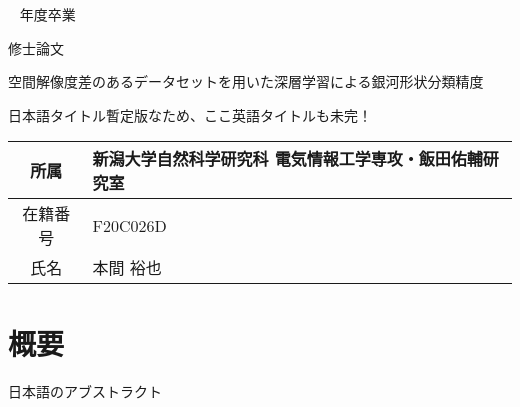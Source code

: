 \documentclass[a4j, 11pt]{jarticle}
\newcounter{fiscal_year}         %
\begin{document}
\begin{titlepage}\Large ~
{\normalsize \the\value{fiscal_year} 年度卒業}
\vfill
\begin{center}

{\Huge 修士論文}
\end{center}
\begin{center}

空間解像度差のあるデータセットを用いた深層学習による銀河形状分類精度
\end{center}
\begin{center}

日本語タイトル暫定版なため、ここ英語タイトルも未完！
\end{center}
\vfill
\begin{center}
\begin{tabular}{|c|l|}
\hline

所属 & 新潟大学自然科学研究科 電気情報工学専攻・飯田佑輔研究室 \\
\hline

在籍番号 & F20C026D \\
\hline

氏名 & 本間 裕也 \\
\hline
\end{tabular}
\end{center}
\vspace{1cm}
\vfill
\end{titlepage}
\pagebreak
\addtocounter{page}{1}
\thispagestyle{empty}  %

\section*{概要}
日本語のアブストラクト
\end{document}
